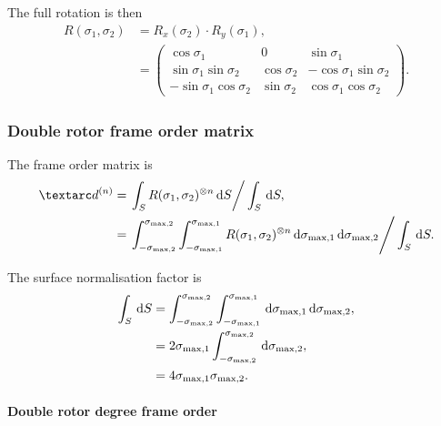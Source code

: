The full rotation is then
\begin{subequations}
\begin{align}
    R(\sigma_1, \sigma_2) &= R_x(\sigma_2) \cdot R_y(\sigma_1) , \\
    &=
        \begin{pmatrix}
             \cos\sigma_1             & 0            &  \sin\sigma_1 \\
             \sin\sigma_1\sin\sigma_2 & \cos\sigma_2 & -\cos\sigma_1\sin\sigma_2 \\
            -\sin\sigma_1\cos\sigma_2 & \sin\sigma_2 &  \cos\sigma_1\cos\sigma_2
        \end{pmatrix}.
\end{align}
\end{subequations}


\subsubsection{Double rotor frame order matrix}

The frame order matrix is
\begin{align}
    \FOn &= \left. \int_S R(\sigma_1, \sigma_2)^{\otimes n} \diff S \right / \int_S \diff S, \\
         &= \left. \int_{-\conesmaxtwo}^{\conesmaxtwo} \int_{-\conesmaxone}^{\conesmaxone} R(\sigma_1, \sigma_2)^{\otimes n} \diff \conesmaxone \diff \conesmaxtwo
    \right / \int_S \diff S .
\end{align}

The surface normalisation factor is
\begin{subequations}
\begin{align}
    \int_S \,\mathrm{d} S &= \int_{-\sigma_{\textrm{max,2}}}^{\sigma_{\textrm{max,2}}} \int_{-\sigma_{\textrm{max,1}}}^{\sigma_{\textrm{max,1}}} \,\mathrm{d} \sigma_{\textrm{max,1}} \,\mathrm{d} \sigma_{\textrm{max,2}} , \\
                   &= 2 \sigma_{\textrm{max,1}} \int_{-\sigma_{\textrm{max,2}}}^{\sigma_{\textrm{max,2}}} \,\mathrm{d} \sigma_{\textrm{max,2}} , \\
                   &= 4 \sigma_{\textrm{max,1}} \sigma_{\textrm{max,2}} .
\end{align}
\end{subequations}


\paragraph{Double rotor  degree frame order}

